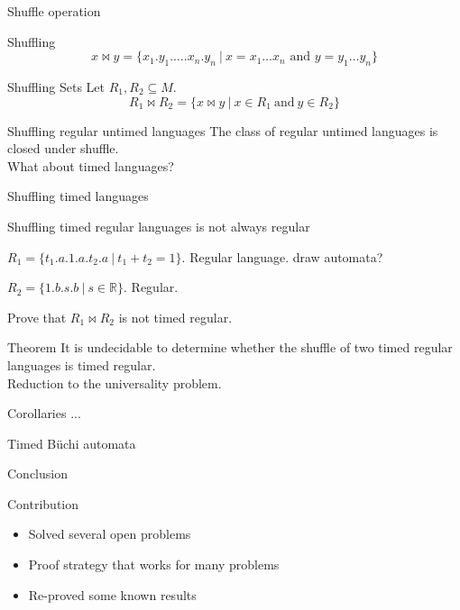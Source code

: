 \begin{frame}{Shuffle operation}
  \begin{block}{Shuffling}
    $$x\bowtie y = \{x_1 . y_1 . \dots . x_n . y_n~|~x=x_1\dots x_n\text{ and }y=y_1\dots y_n\}$$
  \end{block}

  \begin{block}{Shuffling Sets}
    Let $R_1, R_2\subseteq M$.
    $$R_1\bowtie R_2 = \{x\bowtie y~|~x\in R_1~\text{and}~y\in R_2\}$$
  \end{block}

  \begin{exampleblock}{Shuffling regular untimed languages}
    The class of regular untimed languages is closed under shuffle.\\
    What about timed languages?
  \end{exampleblock}
  
\end{frame}


\begin{frame}{Shuffling timed languages}
  \begin{alertblock}{Shuffling timed regular languages is not always regular}
  \end{alertblock}

  $R_1=\{t_1 . a . 1 . a . t_2 . a~|~t_1+t_2 = 1\}$.
  Regular language. draw automata?

  $R_2=\{1 . b . s . b ~|~ s\in\mathbb{R}\}$. Regular.

  Prove that $R_1\bowtie R_2$ is not timed regular.

  \begin{exampleblock}{Theorem}
    It is undecidable to determine whether the shuffle of two timed regular languages is timed regular.\\
    Reduction to the universality problem.
  \end{exampleblock}
    
  
\end{frame}

\begin{frame}{Corollaries}
  ...
\end{frame}

\begin{frame}{Timed Büchi automata}

\end{frame}

\begin{frame}{Conclusion}
  \begin{exampleblock}{Contribution}
    \begin{itemize}
    \item Solved several open problems
    \item Proof strategy that works for many problems
    \item Re-proved some known results
    \end{itemize}
  \end{exampleblock}
\end{frame}
